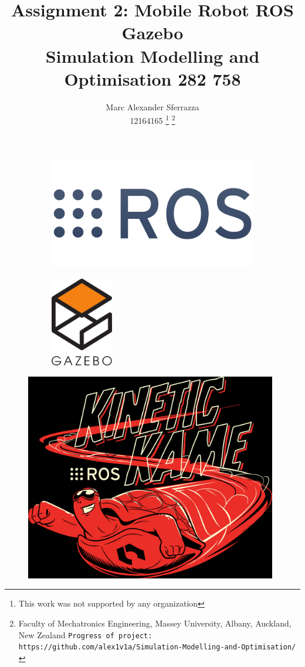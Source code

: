 \documentclass[a4paper, 10pt]{IEEEconf}
\title{\LARGE \bf Assignment 2: Mobile Robot ROS Gazebo\\Simulation Modelling and Optimisation 282 758}
\author{Marc Alexander Sferrazza \\ 12164165
\thanks{This work was not supported by any organization}
\thanks{Faculty of Mechatronics Engineering, Massey University, Albany, Auckland, New Zealand
        {\tt\small Progress of project: https://github.com/alex1v1a/Simulation-Modelling-and-Optimisation/} } }
\begin{document}
\maketitle
\begin{figure}[h]
\begin{subfigure}{0.5\textwidth}
\includegraphics[width=1.5\textwidth, left]{images/ROS} 
\label{fig:ROS}
\end{subfigure}
\begin{subfigure}{0.5\textwidth}
\includegraphics[width=0.3\textwidth, right]{images/gazebo}
\label{fig:Gazebo}
\end{subfigure}
\end{figure}
\begin{figure}[H]
  \begin{center}
  \includegraphics[width=110mm]{images/kinetic}
  \label{fig:kinetic}
  \end{center}
\end{figure}
\thispagestyle{empty}
\pagestyle{plain}
\end{document}
